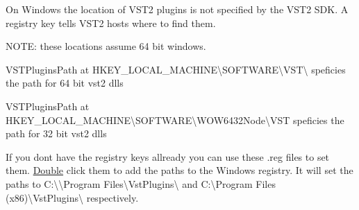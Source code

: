On Windows the location of V\+S\+T2 plugins is not specified by the V\+S\+T2 S\+DK. A registry key tells V\+S\+T2 hosts where to find them.

N\+O\+TE\+: these locations assume 64 bit windows.


\begin{DoxyItemize}
\item V\+S\+T\+Plugins\+Path at H\+K\+E\+Y\+\_\+\+L\+O\+C\+A\+L\+\_\+\+M\+A\+C\+H\+I\+NE\textbackslash{}\+S\+O\+F\+T\+W\+A\+RE\textbackslash{}\+V\+ST\textbackslash{} speficies the path for 64 bit vst2 dlls
\item V\+S\+T\+Plugins\+Path at H\+K\+E\+Y\+\_\+\+L\+O\+C\+A\+L\+\_\+\+M\+A\+C\+H\+I\+NE\textbackslash{}\+S\+O\+F\+T\+W\+A\+RE\textbackslash{}\+W\+O\+W6432\+Node\textbackslash{}\+V\+ST speficies the path for 32 bit vst2 dlls
\end{DoxyItemize}

If you don\textquotesingle{}t have the registry keys allready you can use these .reg files to set them. \mbox{\hyperlink{struct_double}{Double}} click them to add the paths to the Windows registry. It will set the paths to {\ttfamily C\+:\textbackslash{}\textbackslash{}Program Files\textbackslash{}Vst\+Plugins\textbackslash{}} and {\ttfamily C\+:\textbackslash{}Program Files (x86)\textbackslash{}Vst\+Plugins\textbackslash{}} respectively. 